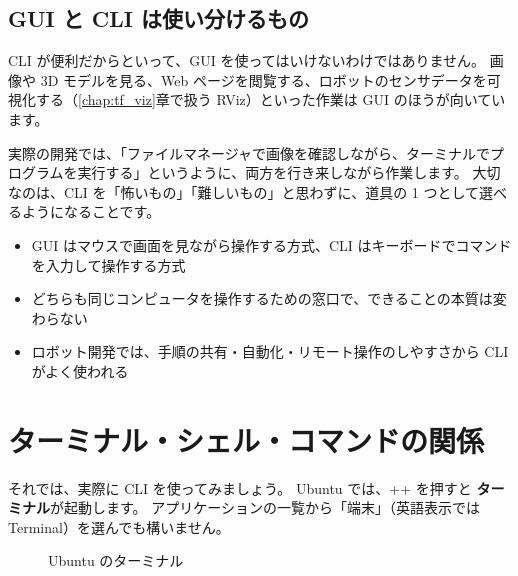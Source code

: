 \subsection{GUI と CLI は使い分けるもの}

CLI が便利だからといって、GUI を使ってはいけないわけではありません。
画像や 3D モデルを見る、Web ページを閲覧する、ロボットのセンサデータを可視化する（\ref{chap:tf_viz}章で扱う RViz）といった作業は GUI のほうが向いています。

実際の開発では、「ファイルマネージャで画像を確認しながら、ターミナルでプログラムを実行する」というように、両方を行き来しながら作業します。
大切なのは、CLI を「怖いもの」「難しいもの」と思わずに、道具の 1 つとして選べるようになることです。

\begin{point}
  \begin{itemize}
    \item GUI はマウスで画面を見ながら操作する方式、CLI はキーボードでコマンドを入力して操作する方式
    \item どちらも同じコンピュータを操作するための窓口で、できることの本質は変わらない
    \item ロボット開発では、手順の共有・自動化・リモート操作のしやすさから CLI がよく使われる
  \end{itemize}
\end{point}

\section{ターミナル・シェル・コマンドの関係}
\label{sec:terminal-relation}

それでは、実際に CLI を使ってみましょう。
Ubuntu では、++ を押すと \textbf{ターミナル}が起動します。
アプリケーションの一覧から「端末」（英語表示では Terminal）を選んでも構いません。


\begin{figure}[tb]
  \centering
  \large
  \caption{Ubuntu のターミナル}
  \label{fig:terminal-window}
\end{figure}

